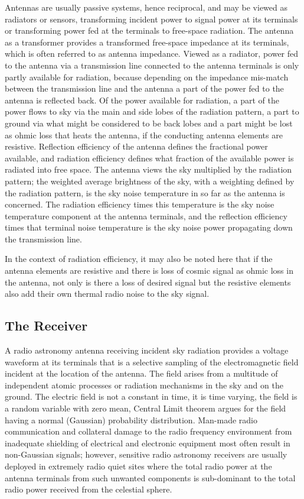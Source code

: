   Antennas are usually passive systems, hence reciprocal, and may be viewed as radiators or sensors, transforming incident power to signal power at its terminals or transforming power fed at the terminals to free-space radiation.  The antenna as a transformer provides a transformed free-space impedance at its terminals, which is often referred to as antenna impedance. Viewed as a radiator, power fed to the antenna via a transmission line connected to the antenna terminals is only partly available for radiation, because depending on the impedance mis-match between the transmission line and the antenna a part of the power fed to the antenna is reflected back. Of the power available for radiation, a part of the power flows to sky via the main and side lobes of the radiation pattern, a part to ground via what might be considered to be back lobes and a part might be lost as ohmic loss that heats the antenna, if the conducting antenna elements are resistive.  Reflection efficiency of the antenna defines the fractional power available, and radiation efficiency defines what fraction of the available power is radiated into free space.  The antenna views the sky multiplied by the radiation pattern; the weighted average brightness of the sky, with a weighting defined by the radiation pattern, is the sky noise temperature in so far as the antenna is concerned. The radiation efficiency times this temperature is the sky noise temperature component at the antenna terminals, and the reflection efficiency times that terminal noise temperature is the sky noise power propagating down the transmission line.  
  
  In the context of radiation efficiency, it may also be noted here that if the antenna elements are resistive and there is loss of cosmic signal as ohmic loss in the antenna, not only is there a loss of desired signal but the resistive elements also add their own thermal radio noise to the sky signal. 
  

\subsection{The Receiver}

  A radio astronomy antenna receiving incident sky radiation provides a voltage waveform at its terminals that is a selective sampling of the electromagnetic field incident at the location of the antenna.  The field arises from a multitude of independent atomic processes or radiation mechanisms in the sky and on the ground.  The electric field is not a constant in time, it is time varying, the field is a random variable with zero mean, Central Limit theorem argues for the field having a normal (Gaussian) probability distribution. Man-made radio communication and collateral damage to the radio frequency environment from inadequate shielding of electrical and electronic equipment most often result in non-Gaussian signals; however, sensitive radio astronomy receivers are usually deployed in extremely radio quiet sites where the total radio power at the antenna terminals from such unwanted components is sub-dominant to the total radio power received from the celestial sphere.
  
